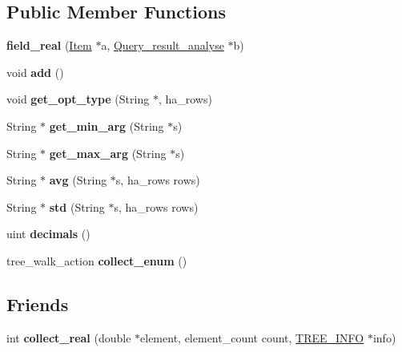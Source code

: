 \subsection*{Public Member Functions}
\begin{DoxyCompactItemize}
\item 
\mbox{\label{classfield__real_acbbcb80a2125219195be8dc5b2ea1a32}} 
{\bfseries field\+\_\+real} (\mbox{\hyperlink{classItem}{Item}} $\ast$a, \mbox{\hyperlink{classQuery__result__analyse}{Query\+\_\+result\+\_\+analyse}} $\ast$b)
\item 
\mbox{\label{classfield__real_a1ce9e295dc150df741b9ef9f1afff15b}} 
void {\bfseries add} ()
\item 
\mbox{\label{classfield__real_ae9bd22d10c78b570f4f38f1774907e5a}} 
void {\bfseries get\+\_\+opt\+\_\+type} (String $\ast$, ha\+\_\+rows)
\item 
\mbox{\label{classfield__real_a90fca90f6e4074e5a9dc731fde5aa4e2}} 
String $\ast$ {\bfseries get\+\_\+min\+\_\+arg} (String $\ast$s)
\item 
\mbox{\label{classfield__real_ae38f49f5c1843b9fb17ed553e7eb42fc}} 
String $\ast$ {\bfseries get\+\_\+max\+\_\+arg} (String $\ast$s)
\item 
\mbox{\label{classfield__real_af5c9626e6b3ab13d906853115f956d92}} 
String $\ast$ {\bfseries avg} (String $\ast$s, ha\+\_\+rows rows)
\item 
\mbox{\label{classfield__real_a507217d17c1e0548af2a2558e884953e}} 
String $\ast$ {\bfseries std} (String $\ast$s, ha\+\_\+rows rows)
\item 
\mbox{\label{classfield__real_a078ddd7bde93b24dcad3f9c1bd204213}} 
uint {\bfseries decimals} ()
\item 
\mbox{\label{classfield__real_a69da5c00828f77f256b8e0debb5cb2d7}} 
tree\+\_\+walk\+\_\+action {\bfseries collect\+\_\+enum} ()
\end{DoxyCompactItemize}
\subsection*{Friends}
\begin{DoxyCompactItemize}
\item 
\mbox{\label{classfield__real_a8f1a7d4cb1148c52d917b7547a0ab2ae}} 
int {\bfseries collect\+\_\+real} (double $\ast$element, element\+\_\+count count, \mbox{\hyperlink{structst__tree__info}{T\+R\+E\+E\+\_\+\+I\+N\+FO}} $\ast$info)
\end{DoxyCompactItemize}
